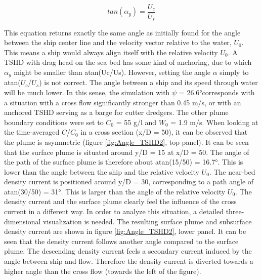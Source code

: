 
\begin{equation}
    tan (\alpha_y) =  \frac{U_c}{U_s}
\end{equation}


\noindent This equation returns exactly the same angle as initially found for the angle between the ship center line and the velocity vector relative to the water, $U_0$. This means a ship would always align itself with the relative velocity $U_0$. A TSHD with drag head on the sea bed has some kind of anchoring, due to which $\alpha_y$ might be smaller than atan(Uc/Us). However, setting the angle $\alpha$ simply to atan($U_c$/$U_s$) is not correct. The angle between a ship and its speed through water will be much lower. In this sense, the simulation with $\psi$ = 26.6°corresponds with a situation with a cross flow significantly stronger than 0.45 m/s, or with an anchored TSHD serving as a barge for cutter dredgers. The other plume boundary conditions were set to $C_0$ = 55 g/l and $W_0$ = 1.9 m/s. \newline \newline
\noindent When looking at the time-averaged $C$/$C_0$ in a cross section (x/D = 50), it can be observed that the plume is asymmetric (figure \ref{fig:Angle_TSHD2}, top panel). It can be seen that the surface plume is situated around y/D = 15 at x/D = 50. The angle of the path of the surface plume is therefore about atan(15/50) = 16.7°. This is lower than the angle between the ship and the relative velocity $U_0$. The near-bed density current is positioned around y/D = 30, corresponding to a path angle of atan(30/50) = 31°. This is larger than the angle of the relative velocity $U_0$. The density current and the surface plume clearly feel the influence of the cross current in a different way. In order to analyze this situation, a detailed three-dimensional visualization is needed.
The resulting surface plume and subsurface density current are shown in figure \ref{fig:Angle_TSHD2}, lower panel. It can be seen that the density current follows another angle compared to the surface plume. The descending density current feels a secondary current induced by the angle between ship and flow. Therefore the density current is diverted towards a higher angle than the cross flow (towards the left of the figure).

